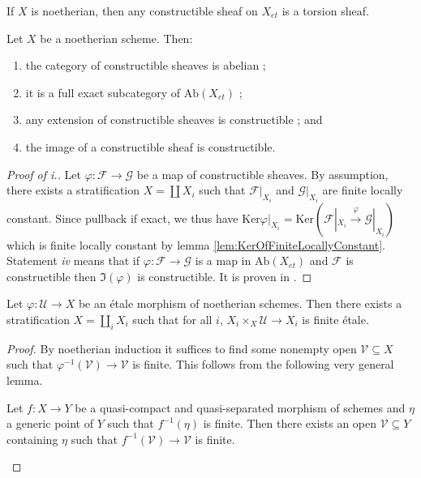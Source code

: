 \begin{remark} 
If $X$ is noetherian, then any constructible sheaf on $X_{et}$ is a torsion sheaf. 
\end{remark}

\begin{lemma}
Let $X$ be a noetherian scheme. Then: 
\begin{enumerate}
\item 
the category of constructible sheaves is abelian ;
\item 
it is a full exact subcategory of $\text{Ab}(X_{et})$ ;
\item 
any extension of constructible sheaves is constructible ; and
\item 
the image of a constructible sheaf is constructible.
\end{enumerate}
\end{lemma} 

\begin{proof}[Proof of i.]
Let $\varphi: \mathcal{F} \to \mathcal{G}$ be a map of constructible sheaves. By assumption, there exists a stratification $X = \coprod X_i$ such that $\mathcal{F}|_{X_i}$ and $\mathcal{G}|_{X_i}$ are finite locally constant. Since pullback if exact, we thus have $\text{Ker} \varphi|_{X_i} = \text{Ker} (\mathcal{F}|_{X_i}\xrightarrow{\varphi} \mathcal{G}|_{X_i})$ which is finite locally constant by lemma \ref{lem:KerOfFiniteLocallyConstant}. Statement {\it iv} means that if $\varphi :\mathcal{F}\to\mathcal{G}$ is a map in $\text{Ab}(X_{et})$ and $\mathcal{F}$ is constructible then $\Im(\varphi)$ is constructible. It is proven in \cite{SGA4.5}.
\end{proof}

\begin{lemma} \label{lem:EtaleRefinesToFiniteEtale}
Let $\varphi: \mathcal{U} \to X$ be an \'etale morphism of noetherian schemes. Then there exists a stratification $X=\coprod_i X_i$ such that for all $i$, $X_i\times_X \mathcal{U} \to X_i$ is finite \'etale. 
\end{lemma}

\begin{proof} 
By noetherian induction it suffices to find some nonempty open $\mathcal{V}\subseteq X$ such that $\varphi^{-1}(\mathcal{V})\to \mathcal{V}$ is finite. This follows from the following very general lemma.
\begin{lemma}
Let $f: X\to Y$ be a quasi-compact and quasi-separated morphism of schemes and $\eta$ a generic point of $Y$ such that $f^{-1}(\eta)$ is finite. Then there exists an open $\mathcal{V} \subseteq Y$ containing $\eta$ such that $f^{-1}(\mathcal{V})\to \mathcal{V}$ is finite.
\end{lemma}
\end{proof}


